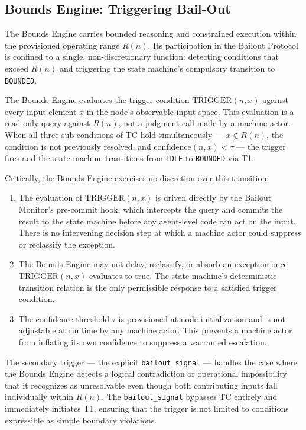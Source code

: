 \subsection{Bounds Engine: Triggering Bail-Out}
\label{sec:bounds-trigger}

The Bounds Engine carries bounded reasoning and constrained execution within the provisioned operating range $R(n)$. Its participation in the Bailout Protocol is confined to a single, non-discretionary function: detecting conditions that exceed $R(n)$ and triggering the state machine's compulsory transition to \texttt{BOUNDED}.

The Bounds Engine evaluates the trigger condition $\text{TRIGGER}(n, x)$ against every input element $x$ in the node's observable input space. This evaluation is a read-only query against $R(n)$, not a judgment call made by a machine actor. When all three sub-conditions of TC hold simultaneously — $x \notin R(n)$, the condition is not previously resolved, and $\text{confidence}(n, x) < \tau$ — the trigger fires and the state machine transitions from \texttt{IDLE} to \texttt{BOUNDED} via T1.

Critically, the Bounds Engine exercises no discretion over this transition:

\begin{enumerate}\itemsep=0pt
\item The evaluation of $\text{TRIGGER}(n, x)$ is driven directly by the Bailout Monitor's pre-commit hook, which intercepts the query and commits the result to the state machine before any agent-level code can act on the input. There is no intervening decision step at which a machine actor could suppress or reclassify the exception.

\item The Bounds Engine may not delay, reclassify, or absorb an exception once $\text{TRIGGER}(n, x)$ evaluates to true. The state machine's deterministic transition relation is the only permissible response to a satisfied trigger condition.

\item The confidence threshold $\tau$ is provisioned at node initialization and is not adjustable at runtime by any machine actor. This prevents a machine actor from inflating its own confidence to suppress a warranted escalation.
\end{enumerate}

The secondary trigger — the explicit \texttt{bailout\_signal} — handles the case where the Bounds Engine detects a logical contradiction or operational impossibility that it recognizes as unresolvable even though both contributing inputs fall individually within $R(n)$. The \texttt{bailout\_signal} bypasses TC entirely and immediately initiates T1, ensuring that the trigger is not limited to conditions expressible as simple boundary violations.

